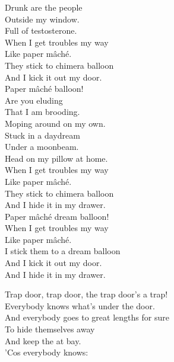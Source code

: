 Drunk are the people \\
Outside my window. \\
Full of testosterone. \\

When I get troubles my way \\
Like paper mâché. \\
They stick to chimera balloon \\
And I kick it out my door. \\

Paper mâché  balloon! \\

Are you eluding \\
That I am brooding. \\
Moping around on my own. \\

Stuck in a daydream \\
Under a moonbeam. \\
Head on my pillow at home. \\

When I get troubles my way \\
Like paper mâché. \\
They stick to chimera balloon \\
And I hide it in my drawer. \\

Paper mâché dream balloon! \\

When I get troubles my way \\
Like paper mâché. \\
I stick them to a dream balloon \\
And I kick it out my door. \\

And I hide it in my drawer. \\




Trap door, trap door, the trap door's a trap! \\

Everybody knows what's under the door. \\
And everybody goes to great lengths for sure \\
To hide themselves away \\
And keep the  at bay. \\
'Cos everybody knows: \\

